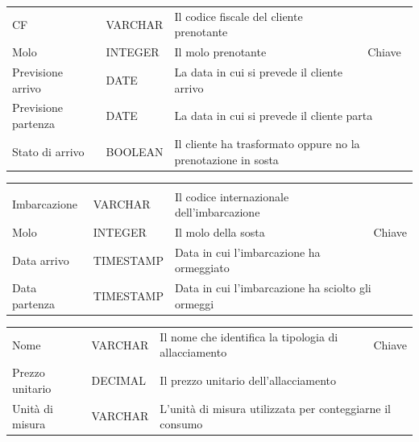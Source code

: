 \begin{center}
    \begin{tabularx}{\textwidth}{|l|l|l|X|}
        \hline
        \rowcolor{gray!30}
        \multicolumn{4}{|c|}{\textbf{Prenotazione}}\\
        \hline
        CF & VARCHAR & Il codice fiscale del cliente prenotante & \multirow{3}{*}{Chiave}\\
        \hhline{---}
        Molo & INTEGER & Il molo prenotante &\\
        \hhline{---}
        Previsione arrivo & DATE & La data in cui si prevede il cliente arrivo &\\
        \hline
        Previsione partenza & DATE & \multicolumn{2}{l|}{La data in cui si prevede il cliente parta}\\
        \hline
        Stato di arrivo & BOOLEAN & \multicolumn{2}{l|}{Il cliente ha trasformato oppure no la prenotazione in sosta}\\
        \hline
    \end{tabularx}
\end{center}

\begin{center}
    \begin{tabularx}{\textwidth}{|l|l|l|X|}
        \hline
        \rowcolor{gray!30}
        \multicolumn{4}{|c|}{\textbf{Sosta}}\\
        Imbarcazione & VARCHAR & Il codice internazionale dell'imbarcazione & \multirow{3}{*}{Chiave}\\
        \hhline{---}
        Molo & INTEGER & Il molo della sosta &\\
        \hhline{---}
        Data arrivo & TIMESTAMP & Data in cui l'imbarcazione ha ormeggiato & \\
        \hline
        Data partenza & TIMESTAMP & \multicolumn{2}{l|}{Data in cui l'imbarcazione ha sciolto gli ormeggi} \\
        \hline
    \end{tabularx}
\end{center}

\begin{center}
    \begin{tabularx}{\textwidth}{|l|l|l|X|}
        \hline
        \rowcolor{gray!30}
        \multicolumn{4}{|c|}{\textbf{Allacciamento}}\\
        \hline
        Nome & VARCHAR & Il nome che identifica la tipologia di allacciamento &Chiave\\
        \hline
        Prezzo unitario & DECIMAL & \multicolumn{2}{l|}{Il prezzo unitario dell'allacciamento}\\
        \hline
        Unità di misura & VARCHAR & \multicolumn{2}{l|}{L'unità di misura utilizzata per conteggiarne il consumo}\\
        \hline
    \end{tabularx}
\end{center}

